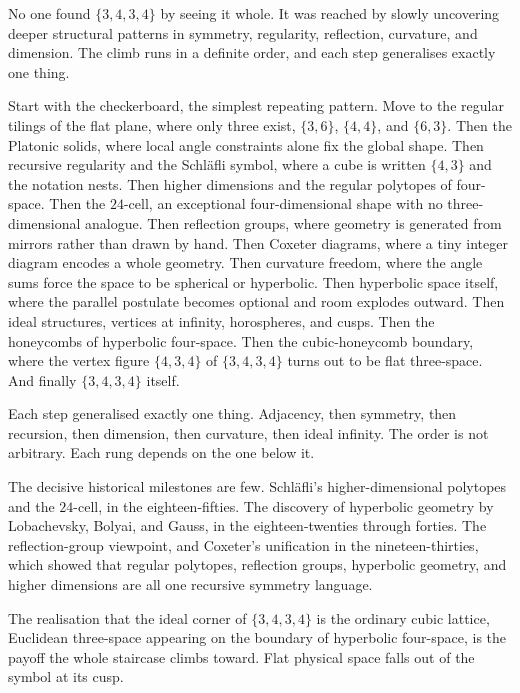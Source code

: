 No one found $\{3,4,3,4\}$ by seeing it whole. It was reached by slowly uncovering deeper structural patterns in symmetry, regularity, reflection, curvature, and dimension. The climb runs in a definite order, and each step generalises exactly one thing.

Start with the checkerboard, the simplest repeating pattern. Move to the regular tilings of the flat plane, where only three exist, $\{3,6\}$, $\{4,4\}$, and $\{6,3\}$. Then the Platonic solids, where local angle constraints alone fix the global shape. Then recursive regularity and the Schl\"afli symbol, where a cube is written $\{4,3\}$ and the notation nests. Then higher dimensions and the regular polytopes of four-space. Then the $24$-cell, an exceptional four-dimensional shape with no three-dimensional analogue. Then reflection groups, where geometry is generated from mirrors rather than drawn by hand. Then Coxeter diagrams, where a tiny integer diagram encodes a whole geometry. Then curvature freedom, where the angle sums force the space to be spherical or hyperbolic. Then hyperbolic space itself, where the parallel postulate becomes optional and room explodes outward. Then ideal structures, vertices at infinity, horospheres, and cusps. Then the honeycombs of hyperbolic four-space. Then the cubic-honeycomb boundary, where the vertex figure $\{4,3,4\}$ of $\{3,4,3,4\}$ turns out to be flat three-space. And finally $\{3,4,3,4\}$ itself.

Each step generalised exactly one thing. Adjacency, then symmetry, then recursion, then dimension, then curvature, then ideal infinity. The order is not arbitrary. Each rung depends on the one below it.

The decisive historical milestones are few. Schl\"afli's higher-dimensional polytopes and the $24$-cell, in the eighteen-fifties. The discovery of hyperbolic geometry by Lobachevsky, Bolyai, and Gauss, in the eighteen-twenties through forties. The reflection-group viewpoint, and Coxeter's unification in the nineteen-thirties, which showed that regular polytopes, reflection groups, hyperbolic geometry, and higher dimensions are all one recursive symmetry language.

\begin{result}
The realisation that the ideal corner of $\{3,4,3,4\}$ is the ordinary cubic lattice, Euclidean three-space appearing on the boundary of hyperbolic four-space, is the payoff the whole staircase climbs toward. Flat physical space falls out of the symbol at its cusp.
\end{result}

